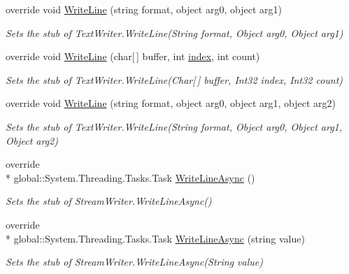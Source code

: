 \begin{DoxyCompactItemize}
override void \hyperlink{class_system_1_1_i_o_1_1_fakes_1_1_stub_stream_writer_a9be719a8931bedfd22da1cc335c9688b}{Write\-Line} (string format, object arg0, object arg1)
\begin{DoxyCompactList}\small\item\em Sets the stub of Text\-Writer.\-Write\-Line(\-String format, Object arg0, Object arg1)\end{DoxyCompactList}\item 
override void \hyperlink{class_system_1_1_i_o_1_1_fakes_1_1_stub_stream_writer_a17580b9e95681c8780de3ce288566274}{Write\-Line} (char\mbox{[}$\,$\mbox{]} buffer, int \hyperlink{jquery-1_810_82-vsdoc_8js_a75bb12d1f23302a9eea93a6d89d0193e}{index}, int count)
\begin{DoxyCompactList}\small\item\em Sets the stub of Text\-Writer.\-Write\-Line(\-Char\mbox{[}$\,$\mbox{]} buffer, Int32 index, Int32 count)\end{DoxyCompactList}\item 
override void \hyperlink{class_system_1_1_i_o_1_1_fakes_1_1_stub_stream_writer_aaf7b94d518413862144bfc7c9ee1320e}{Write\-Line} (string format, object arg0, object arg1, object arg2)
\begin{DoxyCompactList}\small\item\em Sets the stub of Text\-Writer.\-Write\-Line(\-String format, Object arg0, Object arg1, Object arg2)\end{DoxyCompactList}\item 
override \\*
global\-::\-System.\-Threading.\-Tasks.\-Task \hyperlink{class_system_1_1_i_o_1_1_fakes_1_1_stub_stream_writer_ac22bffd97e5fcba56ac619c7c6699465}{Write\-Line\-Async} ()
\begin{DoxyCompactList}\small\item\em Sets the stub of Stream\-Writer.\-Write\-Line\-Async()\end{DoxyCompactList}\item 
override \\*
global\-::\-System.\-Threading.\-Tasks.\-Task \hyperlink{class_system_1_1_i_o_1_1_fakes_1_1_stub_stream_writer_a84d1d30ab1da36d6a82739b8c70d5b2b}{Write\-Line\-Async} (string value)
\begin{DoxyCompactList}\small\item\em Sets the stub of Stream\-Writer.\-Write\-Line\-Async(\-String value)\end{DoxyCompactList}\item 

\end{DoxyCompactItemize}
